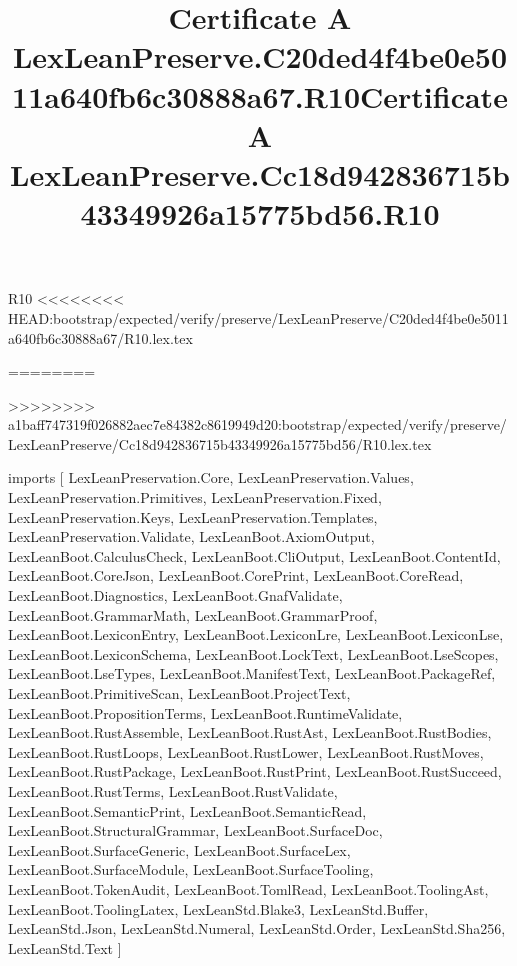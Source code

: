 \begin{lexlean}{R10}
<<<<<<<< HEAD:bootstrap/expected/verify/preserve/LexLeanPreserve/C20ded4f4be0e5011a640fb6c30888a67/R10.lex.tex
\title{Certificate A LexLeanPreserve.C20ded4f4be0e5011a640fb6c30888a67.R10}
========
\title{Certificate A LexLeanPreserve.Cc18d942836715b43349926a15775bd56.R10}
>>>>>>>> a1baff747319f026882aec7e84382c8619949d20:bootstrap/expected/verify/preserve/LexLeanPreserve/Cc18d942836715b43349926a15775bd56/R10.lex.tex
\begin{coremodule}
imports [
  LexLeanPreservation.Core,
  LexLeanPreservation.Values,
  LexLeanPreservation.Primitives,
  LexLeanPreservation.Fixed,
  LexLeanPreservation.Keys,
  LexLeanPreservation.Templates,
  LexLeanPreservation.Validate,
  LexLeanBoot.AxiomOutput,
  LexLeanBoot.CalculusCheck,
  LexLeanBoot.CliOutput,
  LexLeanBoot.ContentId,
  LexLeanBoot.CoreJson,
  LexLeanBoot.CorePrint,
  LexLeanBoot.CoreRead,
  LexLeanBoot.Diagnostics,
  LexLeanBoot.GnafValidate,
  LexLeanBoot.GrammarMath,
  LexLeanBoot.GrammarProof,
  LexLeanBoot.LexiconEntry,
  LexLeanBoot.LexiconLre,
  LexLeanBoot.LexiconLse,
  LexLeanBoot.LexiconSchema,
  LexLeanBoot.LockText,
  LexLeanBoot.LseScopes,
  LexLeanBoot.LseTypes,
  LexLeanBoot.ManifestText,
  LexLeanBoot.PackageRef,
  LexLeanBoot.PrimitiveScan,
  LexLeanBoot.ProjectText,
  LexLeanBoot.PropositionTerms,
  LexLeanBoot.RuntimeValidate,
  LexLeanBoot.RustAssemble,
  LexLeanBoot.RustAst,
  LexLeanBoot.RustBodies,
  LexLeanBoot.RustLoops,
  LexLeanBoot.RustLower,
  LexLeanBoot.RustMoves,
  LexLeanBoot.RustPackage,
  LexLeanBoot.RustPrint,
  LexLeanBoot.RustSucceed,
  LexLeanBoot.RustTerms,
  LexLeanBoot.RustValidate,
  LexLeanBoot.SemanticPrint,
  LexLeanBoot.SemanticRead,
  LexLeanBoot.StructuralGrammar,
  LexLeanBoot.SurfaceDoc,
  LexLeanBoot.SurfaceGeneric,
  LexLeanBoot.SurfaceLex,
  LexLeanBoot.SurfaceModule,
  LexLeanBoot.SurfaceTooling,
  LexLeanBoot.TokenAudit,
  LexLeanBoot.TomlRead,
  LexLeanBoot.ToolingAst,
  LexLeanBoot.ToolingLatex,
  LexLeanStd.Blake3,
  LexLeanStd.Buffer,
  LexLeanStd.Json,
  LexLeanStd.Numeral,
  LexLeanStd.Order,
  LexLeanStd.Sha256,
  LexLeanStd.Text
]


\end{coremodule}
\end{lexlean}
